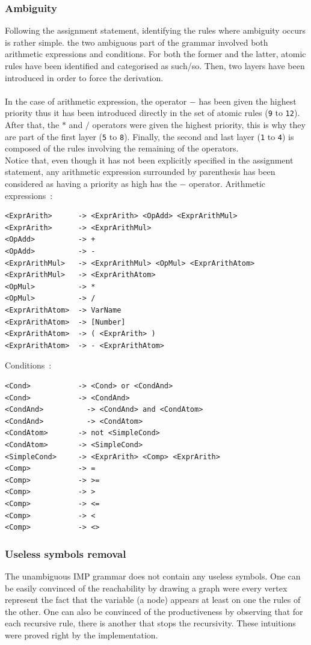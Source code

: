 \documentclass[a4paper,11pt]{article}
\begin{document}
    \subsubsection{Ambiguity}
      Following the assignment statement, identifying the rules where ambiguity occurs is rather simple. the two ambiguous part of the grammar involved both arithmetic expressions and conditions. For both the former and the latter, atomic rules have been identified and categorised as such/so. Then, two layers have been introduced in order to force the derivation.\\\\
      In the case of arithmetic expression, the operator $-$ has been given the highest priority thus it has been introduced directly in the set of atomic rules (\verb|9| to \verb|12|). After that, the $*$ and $/$ operators were given the highest priority, this is why they are part of the first layer (\verb|5| to \verb|8|). Finally, the second and last layer (\verb|1| to \verb|4|) is composed of the rules involving the remaining of the operators.\\
      Notice that, even though it has not been explicitly specified in the assignment statement, any arithmetic expression surrounded by parenthesis has been considered as having a priority as high has the $-$ operator.
      Arithmetic expressions~:
      \begin{lstlisting}
<ExprArith>	     -> <ExprArith> <OpAdd> <ExprArithMul> 
<ExprArith>	     -> <ExprArithMul> 
<OpAdd>	         -> + 
<OpAdd>	         -> - 
<ExprArithMul>	 -> <ExprArithMul> <OpMul> <ExprArithAtom> 
<ExprArithMul>	 -> <ExprArithAtom> 
<OpMul>	         -> * 
<OpMul>	         -> / 
<ExprArithAtom>	 -> VarName 
<ExprArithAtom>	 -> [Number] 
<ExprArithAtom>	 -> ( <ExprArith> ) 
<ExprArithAtom>	 -> - <ExprArithAtom>\end{lstlisting}
      Conditions~:
      \begin{lstlisting}
<Cond>	         -> <Cond> or <CondAnd> 
<Cond>	         -> <CondAnd> 
<CondAnd>	       -> <CondAnd> and <CondAtom> 
<CondAnd>	       -> <CondAtom> 
<CondAtom>	     -> not <SimpleCond> 
<CondAtom>	     -> <SimpleCond> 
<SimpleCond>     -> <ExprArith> <Comp> <ExprArith> 
<Comp>	         -> = 
<Comp>	         -> >= 
<Comp>	         -> >  
<Comp>	         -> <=  
<Comp>	         -> <  
<Comp>	         -> <>\end{lstlisting}

    \subsubsection{Useless symbols removal}
      The unambiguous IMP grammar does not contain any useless symbols. One can be easily convinced of the reachability by drawing a graph were every vertex represent the fact that the variable (a node) appears at least on one the rules of the other. One can also be convinced of the productiveness by observing that for each recursive rule, there is another that stops the recursivity. These intuitions were proved right by the implementation.
      
\end{document}
